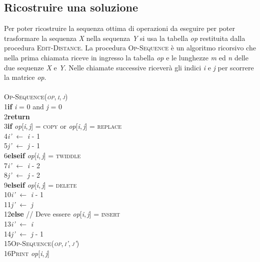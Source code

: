 \documentclass[10pt, a4paper]{report}
\newcommand\firsttab[1][0.5cm]{\hspace*{#1}}
\newcommand\secondtab[1][1cm]{\hspace*{#1}}
\begin{document}
\subsection{Ricostruire una soluzione}
Per poter ricostruire la sequenza ottima di operazioni da eseguire per poter trasformare la sequenza \textit{X} nella sequenza \textit{Y} si usa la tabella \textit{op} restituita dalla procedura \textsc{Edit-Distance}. La procedura \textsc{Op-Sequence} è un algoritmo ricorsivo che nella prima chiamata riceve in ingresso la tabella \textit{op} e le lunghezze \textit{m} ed \textit{n} delle due sequenze \textit{X} e \textit{Y}. Nelle chiamate successive riceverà gli indici \textit{i} e \textit{j} per scorrere la matrice \textit{op}.\\\\
\textsc{Op-Sequence(\textit{op},\,\textit{i},\,\textit{j})}\\
1\firsttab\textbf{if} \textit{i} = 0 and \textit{j} = 0\\
2\secondtab\textbf{return}\\
3\firsttab\textbf{if} \textit{op}[\textit{i},\,\textit{j}] = \textsc{copy} or \textit{op}[\textit{i},\,\textit{j}] = \textsc{replace}\\
4\secondtab\textit{i'} $\leftarrow$ \textit{i} - 1\\
5\secondtab\textit{j'} $\leftarrow$ \textit{j} - 1\\
6\firsttab\textbf{elseif} \textit{op}[\textit{i},\,\textit{j}] = \textsc{twiddle}\\
7\secondtab\textit{i'} $\leftarrow$ \textit{i} - 2\\
8\secondtab\textit{j'} $\leftarrow$ \textit{j} - 2\\
9\firsttab\textbf{elseif} \textit{op}[\textit{i},\,\textit{j}] = \textsc{delete}\\
10\secondtab\textit{i'} $\leftarrow$ \textit{i} - 1\\
11\secondtab\textit{j'} $\leftarrow$ \textit{j}\\
12\firsttab\textbf{else} // Deve essere \textit{op}[\textit{i},\,\textit{j}] = \textsc{insert}\\
13\secondtab\textit{i'} $\leftarrow$ \textit{i}\\
14\secondtab\textit{j'} $\leftarrow$ \textit{j} - 1\\
15\firsttab\textsc{Op-Sequence(\textit{op},\,\textit{i'},\,\textit{j'})}\\
16\firsttab\textsc{Print} \textit{op}[\textit{i},\,\textit{j}]
\end{document}
